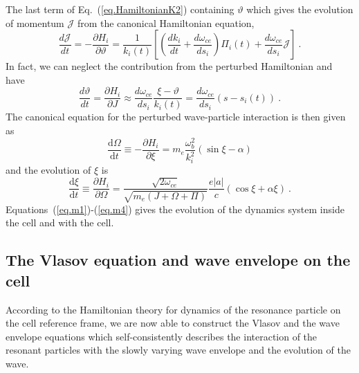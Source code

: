 The last term of Eq.~(\ref{eq.HamiltonianK2}) containing $\vartheta$ which gives the evolution of momentum $\mathcal{J}$ from the canonical Hamiltonian equation,
\begin{equation}\label{eq.m3}
        \frac{d \mathcal{J}}{d t} =-\frac{\partial H_{i}}{\partial \vartheta}=\frac{1}{k_{i}(t)}\left[\left(\frac{d k_{i}}{d t}+\frac{d \omega_{c e}}{d s_{i}}\right) \Pi_{i}(t)+\frac{d \omega_{c e}}{d s_{i}} \mathcal{J}\right]~.
\end{equation}
In fact, we can neglect the contribution from the perturbed Hamiltonian and have
\begin{equation}\label{eq.m4}
    \frac{d \vartheta}{d t} =\frac{\partial H_{i}}{\partial J} \approx \frac{d \omega_{c e}}{d s_{i}} \frac{\xi-\vartheta}{k_{i}(t)}=\frac{d \omega_{c e}}{d s_{i}}\left(s-s_{i}(t)\right)~.
\end{equation}
The canonical equation for the perturbed wave-particle interaction is then given as 
\begin{equation}\label{eq.m1}
    \frac{\mathrm{d}\Omega}{\mathrm{d}t} \equiv - \frac{\partial H_i}{\partial \xi} = m_e \frac{\omega_b^2}{k_i^2}\left(\sin \xi - \alpha \right)
\end{equation}
and the evolution of $\xi$ is 
\begin{equation}\label{eq.m2}
    \frac{\mathrm{d}\xi}{\mathrm{d}t} \equiv \frac{\partial H_i}{\partial \Omega} = \frac{\sqrt{2\omega_{ce}} }{\sqrt{m_e (J+\Omega+\Pi)}}\frac{e |a|}{c}(\cos \xi + \alpha \xi)~.
\end{equation}
Equations~(\ref{eq.m1})-(\ref{eq.m4}) gives the evolution of the dynamics system inside the cell and with the cell. 

\subsection{The Vlasov equation and wave envelope on the cell}
According to the Hamiltonian theory for dynamics of the resonance particle on the cell reference frame, we are now able to construct the Vlasov and the wave envelope equations which self-consistently describes the interaction of the resonant particles with the slowly varying wave envelope and the evolution of the wave.

